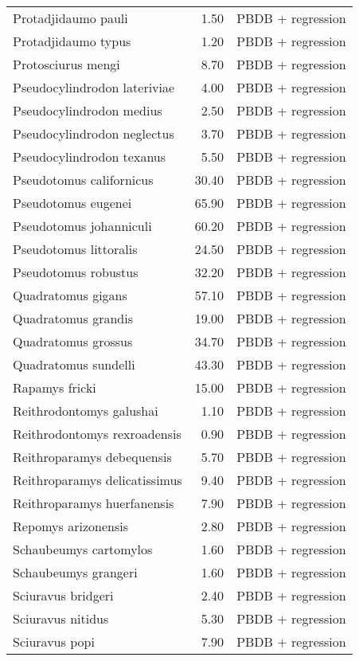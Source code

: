 \begin{table}[ht]
\begin{tabular}{lrl}
  Protadjidaumo pauli & 1.50 & PBDB + regression \\ 
  Protadjidaumo typus & 1.20 & PBDB + regression \\ 
  Protosciurus mengi & 8.70 & PBDB + regression \\ 
  Pseudocylindrodon lateriviae & 4.00 & PBDB + regression \\ 
  Pseudocylindrodon medius & 2.50 & PBDB + regression \\ 
  Pseudocylindrodon neglectus & 3.70 & PBDB + regression \\ 
  Pseudocylindrodon texanus & 5.50 & PBDB + regression \\ 
  Pseudotomus californicus & 30.40 & PBDB + regression \\ 
  Pseudotomus eugenei & 65.90 & PBDB + regression \\ 
  Pseudotomus johanniculi & 60.20 & PBDB + regression \\ 
  Pseudotomus littoralis & 24.50 & PBDB + regression \\ 
  Pseudotomus robustus & 32.20 & PBDB + regression \\ 
  Quadratomus gigans & 57.10 & PBDB + regression \\ 
  Quadratomus grandis & 19.00 & PBDB + regression \\ 
  Quadratomus grossus & 34.70 & PBDB + regression \\ 
  Quadratomus sundelli & 43.30 & PBDB + regression \\ 
  Rapamys fricki & 15.00 & PBDB + regression \\ 
  Reithrodontomys galushai & 1.10 & PBDB + regression \\ 
  Reithrodontomys rexroadensis & 0.90 & PBDB + regression \\ 
  Reithroparamys debequensis & 5.70 & PBDB + regression \\ 
  Reithroparamys delicatissimus & 9.40 & PBDB + regression \\ 
  Reithroparamys huerfanensis & 7.90 & PBDB + regression \\ 
  Repomys arizonensis & 2.80 & PBDB + regression \\ 
  Schaubeumys cartomylos & 1.60 & PBDB + regression \\ 
  Schaubeumys grangeri & 1.60 & PBDB + regression \\ 
  Sciuravus bridgeri & 2.40 & PBDB + regression \\ 
  Sciuravus nitidus & 5.30 & PBDB + regression \\ 
  Sciuravus popi & 7.90 & PBDB + regression \\ 

\end{tabular}
\end{table}
